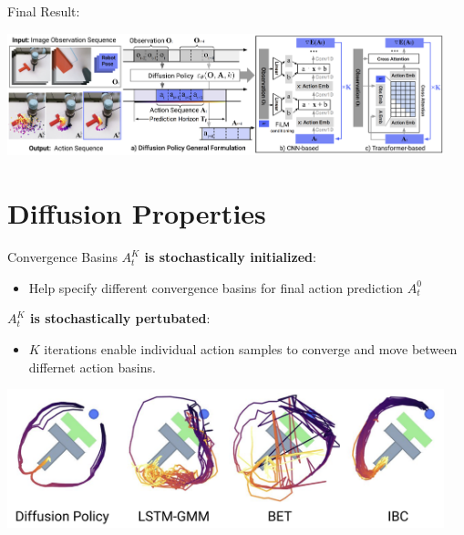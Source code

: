 \documentclass{beamer}
\begin{document}
\begin{frame}[t]{Final Result:}
    \begin{center}
        \includegraphics[width=0.95\textwidth]{./img/diffusion_result.png}
    \end{center}
\end{frame}




\section{Diffusion Properties}
\begin{frame}[t]{Convergence Basins}
    \textbf{$A_t^K$ is stochastically initialized}:
    \begin{itemize}[label=-]
        \item Help specify different convergence basins for final action prediction $A_t^0$
    \end{itemize}
    
    \textbf{$A_t^K$ is stochastically pertubated}:
    \begin{itemize}[label=-]
        \item $K$ iterations enable individual action samples to converge and move between differnet action basins.
    \end{itemize}
    \begin{center}
        \includegraphics[width=0.95\textwidth]{./img/multimodal_beh.png}
    \end{center}
\end{frame}
\end{document}
